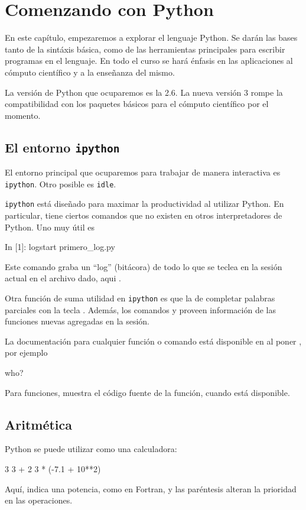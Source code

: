 \chapter{Comenzando con Python}

En este capítulo, empezaremos a explorar el lenguaje Python. Se darán las bases tanto de la sintáxis básica, como de las herramientas principales para escribir programas en el lenguaje. En todo el curso se hará énfasis en las aplicaciones al cómputo científico y a la enseñanza del mismo.

La versión de Python que ocuparemos es la 2.6. La nueva versión 3 rompe la compatibilidad con los paquetes básicos para el cómputo científico por el momento.


\section{El entorno \texttt{ipython}}

El entorno principal que ocuparemos para trabajar de manera interactiva es \texttt{ipython}. Otro posible es \texttt{idle}.

\texttt{ipython} está diseñado para maximar la productividad al utilizar Python.
En particular, tiene ciertos comandos que no existen en otros interpretadores de Python.
Uno muy útil es
\begin{python}
In [1]: logstart primero_log.py
\end{python}
Este comando graba un ``log'' (bitácora) de  todo lo que se teclea en la sesión actual en el archivo dado, aqui .

Otra función de suma utilidad en \texttt{ipython} es que la de completar palabras parciales con la tecla .
Además, los comandos  y  proveen información de las funciones nuevas agregadas en la sesión.

La documentación para cualquier función o comando está disponible en  al poner , por ejemplo
\begin{python}
who?
\end{python}
Para funciones,  muestra el código fuente de la función, cuando está disponible.


\section{Aritmética}
Python se puede utilizar como una calculadora:
\begin{python}
3
3 + 2
3 * (-7.1 + 10**2)
\end{python}
Aquí, \inl{**} indica una potencia, como en Fortran, y las paréntesis alteran la prioridad en las operaciones.


